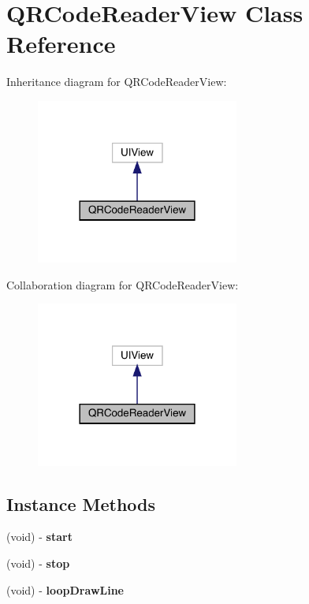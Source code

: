 \hypertarget{interface_q_r_code_reader_view}{}\section{Q\+R\+Code\+Reader\+View Class Reference}
\label{interface_q_r_code_reader_view}


Inheritance diagram for Q\+R\+Code\+Reader\+View\+:\nopagebreak
\begin{figure}[H]
\begin{center}
\leavevmode
\includegraphics[width=189pt]{interface_q_r_code_reader_view__inherit__graph}
\end{center}
\end{figure}


Collaboration diagram for Q\+R\+Code\+Reader\+View\+:\nopagebreak
\begin{figure}[H]
\begin{center}
\leavevmode
\includegraphics[width=189pt]{interface_q_r_code_reader_view__coll__graph}
\end{center}
\end{figure}
\subsection*{Instance Methods}
\begin{DoxyCompactItemize}
\item 
\mbox{\label{interface_q_r_code_reader_view_a94c00b4be4c0aeaab4bd338e0ed66e5f}} 
(void) -\/ {\bfseries start}
\item 
\mbox{\label{interface_q_r_code_reader_view_a24864bb5e053a65291a43b143abac711}} 
(void) -\/ {\bfseries stop}
\item 
\mbox{\label{interface_q_r_code_reader_view_a2cbef2d1e052be878a477c4c74b85d3c}} 
(void) -\/ {\bfseries loop\+Draw\+Line}
\end{DoxyCompactItemize}
